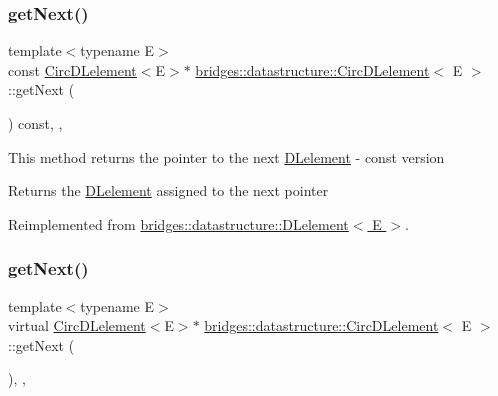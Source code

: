 \mbox{\label{classbridges_1_1datastructure_1_1_circ_d_lelement_a3b54f07ffa49151ed13d8b8df964a4ee}} 
\subsubsection{\texorpdfstring{get\+Next()}{getNext()}\hspace{0.1cm}{\footnotesize\ttfamily [1/2]}}
{\footnotesize\ttfamily template$<$typename E$>$ \\
const \hyperlink{classbridges_1_1datastructure_1_1_circ_d_lelement}{Circ\+D\+Lelement}$<$E$>$$\ast$ \hyperlink{classbridges_1_1datastructure_1_1_circ_d_lelement}{bridges\+::datastructure\+::\+Circ\+D\+Lelement}$<$ E $>$\+::get\+Next (\begin{DoxyParamCaption}{ }\end{DoxyParamCaption}) const\hspace{0.3cm}{\ttfamily [inline]}, {\ttfamily [override]}, {\ttfamily [virtual]}}

This method returns the pointer to the next \hyperlink{classbridges_1_1datastructure_1_1_d_lelement}{D\+Lelement} -\/ const version \begin{DoxyReturn}{Returns}
the \hyperlink{classbridges_1_1datastructure_1_1_d_lelement}{D\+Lelement} assigned to the next pointer 
\end{DoxyReturn}


Reimplemented from \hyperlink{classbridges_1_1datastructure_1_1_d_lelement_a8599e5be5fc1771d4e8a40f6de67b4a7}{bridges\+::datastructure\+::\+D\+Lelement$<$ E $>$}.

\mbox{\label{classbridges_1_1datastructure_1_1_circ_d_lelement_a80681d0382643a6df21da1bec4067004}} 
\subsubsection{\texorpdfstring{get\+Next()}{getNext()}\hspace{0.1cm}{\footnotesize\ttfamily [2/2]}}
{\footnotesize\ttfamily template$<$typename E$>$ \\
virtual \hyperlink{classbridges_1_1datastructure_1_1_circ_d_lelement}{Circ\+D\+Lelement}$<$E$>$$\ast$ \hyperlink{classbridges_1_1datastructure_1_1_circ_d_lelement}{bridges\+::datastructure\+::\+Circ\+D\+Lelement}$<$ E $>$\+::get\+Next (\begin{DoxyParamCaption}{ }\end{DoxyParamCaption})\hspace{0.3cm}{\ttfamily [inline]}, {\ttfamily [override]}, {\ttfamily [virtual]}}

